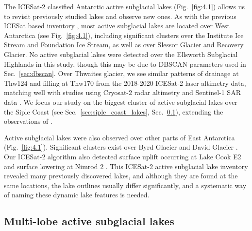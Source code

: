 The ICESat-2 classified Antarctic active subglacial lakes (Fig.~\ref{fig:4.1}) allows us to revisit previously studied lakes and observe new ones.
As with the previous ICESat based inventory \citep{Smithinventoryactivesubglacial2009}, most active subglacial lakes are located over West Antarctica (see Fig.~\ref{fig:4.1}), including significant clusters over the Institute Ice Stream and Foundation Ice Stream, as well as over Slessor Glacier and Recovery Glacier.
No active subglacial lakes were detected over the Ellsworth Subglacial Highlands \citep[c.f.][]{NapoleoniSubglaciallakeshydrology2020} in this study, though this may be due to DBSCAN parameters used in Sec.~\ref{sec:dbscan}.
Over Thwaites glacier, we see similar patterns of drainage at Thw124 and filling at Thw170 from the 2018-2020 ICESat-2 laser altimetry data, matching well with studies using Cryosat-2 radar altimetry \citep{SmithConnectedsubglaciallake2017,MalczykRepeatSubglacialLake2020} and Sentinel-1 SAR data \citep{HoffmanBriefCommunicationHeterogenous2020}.
We focus our study on the biggest cluster of active subglacial lakes over the Siple Coast (see Sec.~\ref{sec:siple_coast_lakes}, Sec.~\ref{sec:multi-lobe}), extending the observations of \citet{SiegfriedEpisodicicevelocity2016}.

Active subglacial lakes were also observed over other parts of East Antarctica (Fig.~\ref{fig:4.1}).
Significant clusters exist over Byrd Glacier \citep[c.f.][]{WrightSubglacialhydrologicalconnectivity2014} and David Glacier \citep[c.f.][]{LindzeyAerogeophysicalcharacterizationactive2020}.
Our ICESat-2 algorithm also detected surface uplift occurring at Lake Cook E2 \citep[c.f.][]{LiRadarSoundingConfirms2020} and surface lowering at Nimrod 2 \citep[c.f.][]{Smithinventoryactivesubglacial2009}.
This ICESat-2 active subglacial lake inventory revealed many previously discovered lakes, and although they are found at the same locations, the lake outlines usually differ significantly, and a systematic way of naming these dynamic lake features is needed.

\subsection{Multi-lobe active subglacial lakes} \label{sec:multi-lobe}


